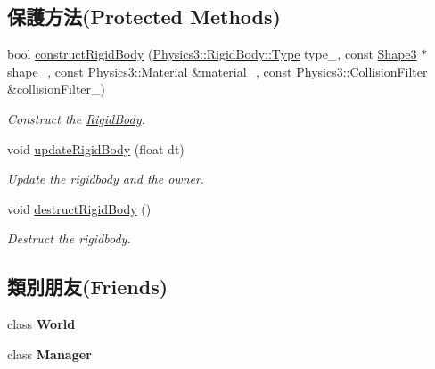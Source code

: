 \subsection*{保護方法(Protected Methods)}
\begin{DoxyCompactItemize}
\item 
bool \hyperlink{class_i_dream_sky_1_1_physics3_1_1_rigid_body_a5d62d5520cf4790b254e0d81a5f2d2bd}{construct\+Rigid\+Body} (\hyperlink{class_i_dream_sky_1_1_physics3_1_1_rigid_body_a8a970d66442558ce0a3ce7b8009c14fa}{Physics3\+::\+Rigid\+Body\+::\+Type} type\+\_\+, const \hyperlink{class_i_dream_sky_1_1_shape3}{Shape3} $\ast$shape\+\_\+, const \hyperlink{class_i_dream_sky_1_1_physics3_1_1_material}{Physics3\+::\+Material} \&material\+\_\+, const \hyperlink{class_i_dream_sky_1_1_physics3_1_1_collision_filter}{Physics3\+::\+Collision\+Filter} \&collision\+Filter\+\_\+)
\begin{DoxyCompactList}\small\item\em Construct the \hyperlink{class_i_dream_sky_1_1_physics3_1_1_rigid_body}{Rigid\+Body}. \end{DoxyCompactList}\item 
void \hyperlink{class_i_dream_sky_1_1_physics3_1_1_rigid_body_a4b74946c58d83988424072399cb265c2}{update\+Rigid\+Body} (float dt)
\begin{DoxyCompactList}\small\item\em Update the rigidbody and the owner. \end{DoxyCompactList}\item 
void \hyperlink{class_i_dream_sky_1_1_physics3_1_1_rigid_body_a476e3fa127c84f6a645647dd68013be1}{destruct\+Rigid\+Body} ()\hypertarget{class_i_dream_sky_1_1_physics3_1_1_rigid_body_a476e3fa127c84f6a645647dd68013be1}{}\label{class_i_dream_sky_1_1_physics3_1_1_rigid_body_a476e3fa127c84f6a645647dd68013be1}

\begin{DoxyCompactList}\small\item\em Destruct the rigidbody. \end{DoxyCompactList}\end{DoxyCompactItemize}
\subsection*{類別朋友(Friends)}
\begin{DoxyCompactItemize}
\item 
class {\bfseries World}\hypertarget{class_i_dream_sky_1_1_physics3_1_1_rigid_body_a7b4bcdf992c21ae83363f25df05b1d25}{}\label{class_i_dream_sky_1_1_physics3_1_1_rigid_body_a7b4bcdf992c21ae83363f25df05b1d25}

\item 
class {\bfseries Manager}\hypertarget{class_i_dream_sky_1_1_physics3_1_1_rigid_body_adddd5c43ff870a047aa66db4edf82a7e}{}\label{class_i_dream_sky_1_1_physics3_1_1_rigid_body_adddd5c43ff870a047aa66db4edf82a7e}

\end{DoxyCompactItemize}


